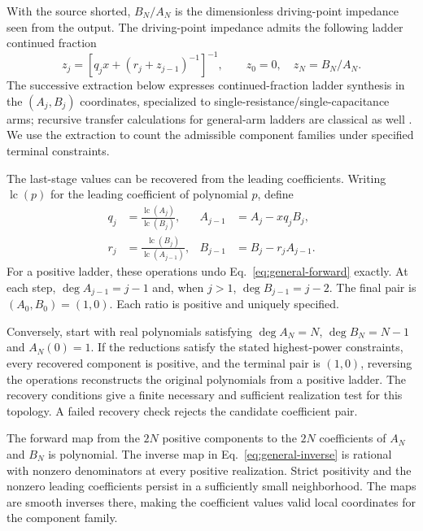With the source shorted, $B_N/A_N$ is the dimensionless driving-point impedance seen from the output. The driving-point impedance admits the following ladder continued fraction \citep{guillemin1949rcsynthesis,lee1978chain}
\[
z_j = \left[q_jx+\left(r_j+z_{j-1}\right)^{-1}\right]^{-1},
\qquad z_0=0,\quad z_N=B_N/A_N.
\]
The successive extraction below expresses continued-fraction ladder synthesis \citep{guillemin1949rcsynthesis,lee1978chain} in the $(A_j,B_j)$ coordinates, specialized to single-resistance/single-capacitance arms; recursive transfer calculations for general-arm ladders are classical as well \citep{fialkow1951rcladder}. We use the extraction to count the admissible component families under specified terminal constraints.

The last-stage values can be recovered from the leading coefficients. Writing $\operatorname{lc}(p)$ for the leading coefficient of polynomial $p$, define
\begin{equation}\label{eq:general-inverse}
\begin{aligned}
q_j&=\frac{\operatorname{lc}(A_j)}{\operatorname{lc}(B_j)},&
A_{j-1}&=A_j-xq_jB_j,\\
r_j&=\frac{\operatorname{lc}(B_j)}{\operatorname{lc}(A_{j-1})},&
B_{j-1}&=B_j-r_jA_{j-1}.
\end{aligned}
\end{equation}
For a positive ladder, these operations undo Eq.~\eqref{eq:general-forward} exactly. At each step, $\deg A_{j-1}=j-1$ and, when $j>1$, $\deg B_{j-1}=j-2$. The final pair is $(A_0,B_0)=(1,0)$. Each ratio is positive and uniquely specified.

Conversely, start with real polynomials satisfying $\deg A_N=N$, $\deg B_N=N-1$ and $A_N(0)=1$. If the reductions satisfy the stated highest-power constraints, every recovered component is positive, and the terminal pair is $(1,0)$, reversing the operations reconstructs the original polynomials from a positive ladder. The recovery conditions give a finite necessary and sufficient realization test for this topology. A failed recovery check rejects the candidate coefficient pair.

The forward map from the $2N$ positive components to the $2N$ coefficients of $A_N$ and $B_N$ is polynomial. The inverse map in Eq.~\eqref{eq:general-inverse} is rational with nonzero denominators at every positive realization. Strict positivity and the nonzero leading coefficients persist in a sufficiently small neighborhood. The maps are smooth inverses there, making the coefficient values valid local coordinates for the component family.

